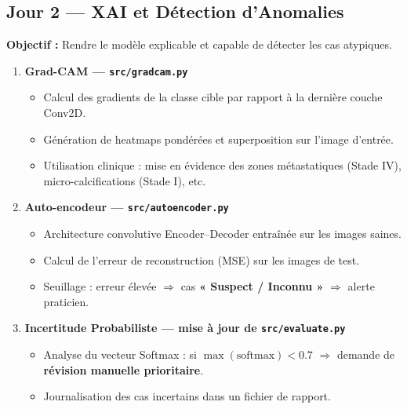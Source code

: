 \documentclass[12pt,a4paper]{article}
\begin{document}
\newpage
\subsection{Jour 2 — XAI et Détection d'Anomalies}

\begin{daybox}
\textbf{Objectif :} Rendre le modèle explicable et capable de détecter les cas atypiques.
\end{daybox}

\vspace{0.4cm}

\begin{enumerate}[label=\textbf{Étape \arabic*.}, leftmargin=2.5cm, itemsep=0.4cm, start=6]

  \item \textbf{Grad-CAM — \texttt{src/gradcam.py}}
  \begin{itemize}
    \item Calcul des gradients de la classe cible par rapport à la dernière couche Conv2D.
    \item Génération de heatmaps pondérées et superposition sur l'image d'entrée.
    \item Utilisation clinique : mise en évidence des zones métastatiques (Stade IV), micro-calcifications (Stade I), etc.
  \end{itemize}

  \item \textbf{Auto-encodeur — \texttt{src/autoencoder.py}}
  \begin{itemize}
    \item Architecture convolutive Encoder–Decoder entraînée sur les images saines.
    \item Calcul de l'erreur de reconstruction (MSE) sur les images de test.
    \item Seuillage : erreur élevée $\Rightarrow$ cas \textbf{« Suspect / Inconnu »} $\Rightarrow$ alerte praticien.
  \end{itemize}

  \item \textbf{Incertitude Probabiliste — mise à jour de \texttt{src/evaluate.py}}
  \begin{itemize}
    \item Analyse du vecteur Softmax : si $\max(\text{softmax}) < 0.7$ $\Rightarrow$ demande de \textbf{révision manuelle prioritaire}.
    \item Journalisation des cas incertains dans un fichier de rapport.
  \end{itemize}

\end{enumerate}
\end{document}
